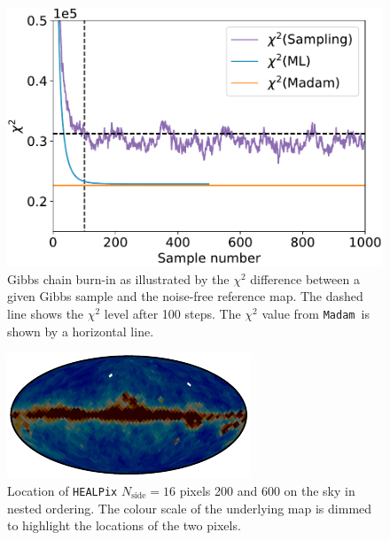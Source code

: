 \documentclass[twocolumn]{aa}
\newcommand{\Madam}{\texttt{Madam}}
\begin{document}
\begin{figure}
  \center
  \includegraphics[width=\linewidth]{figs/Fig_BurnIn_chi2.pdf}
  \caption{Gibbs chain burn-in as illustrated by the $\chi^2$
    difference between a given Gibbs sample and the noise-free 
    reference map. The dashed line shows the $\chi^2$ level after 100
    steps. The $\chi^2$ value from \Madam\ is shown by a horizontal line.}\label{fig:burn_in}
\end{figure}

\begin{figure}
  \center
  \includegraphics[width=\linewidth]{figs/Fig_pixel_illustration_I.pdf}
	\caption{Location of \texttt{HEALPix} $N_{\textrm{side}}=16$ pixels 200 and
    600 on the sky in nested ordering.  The colour scale of the
    underlying map is dimmed to highlight the locations of the two
    pixels.}\label{fig:pixels}
\end{figure}
\end{document}
